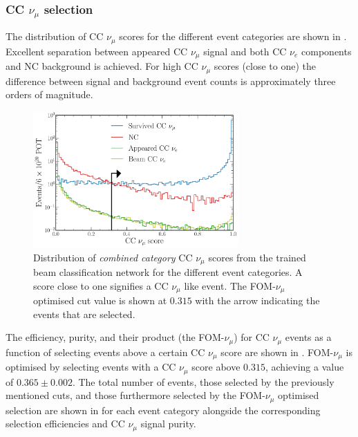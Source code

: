 \subsubsection*{CC $\nu_{\mu}$ selection} %

The distribution of CC $\nu_{\mu}$ scores for the different event categories are shown in
. Excellent separation between appeared CC $\nu_{\mu}$
signal and both CC $\nu_{e}$ components and NC background is achieved. For high CC $\nu_{\mu}$
scores (close to one) the difference between signal and background event counts is approximately
three orders of magnitude.

\begin{figure} %
    \includegraphics[width=0.7\textwidth]{diagrams/7-results/final_beam_numu_outputs.pdf}
    \caption[Distribution of CC $\nu_{\mu}$ scores from the trained beam classification network]
    {Distribution of \emph{combined category} CC $\nu_{\mu}$ scores from the trained beam
        classification network for the different event categories. A score close to one signifies
        a CC $\nu_{\mu}$ like event. The FOM-$\nu_{\mu}$ optimised cut value is shown at $0.315$
        with the arrow indicating the events that are selected.}
    \label{fig:final_beam_numu_outputs}
\end{figure}

The efficiency, purity, and their product (the FOM-$\nu_{\mu}$) for CC $\nu_{\mu}$ events as a
function of selecting events above a certain CC $\nu_{\mu}$ score are shown in
. FOM-$\nu_{\mu}$ is optimised by selecting events with a CC
$\nu_{\mu}$ score above $0.315$, achieving a value of $0.365\pm0.002$. The total number of events,
those selected by the previously mentioned cuts, and those furthermore selected by the
FOM-$\nu_{\mu}$ optimised selection are shown in  for each event
category alongside the corresponding selection efficiencies and CC $\nu_{\mu}$ signal purity.

